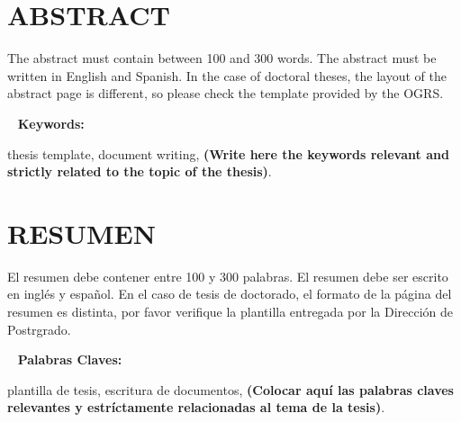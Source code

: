 \documentclass[12pt,reqno,oneside]{pucthesis}         %
\begin{document}
\chapter*{ABSTRACT}

The abstract must contain between 100 and 300 words.  The abstract must be written in English and Spanish.  In the case of doctoral theses, the layout of the abstract page is different, so please check the template provided by the OGRS.




~\vfill
{\bf Keywords:} \parbox[t]{.8\textwidth}{
  thesis template, document writing, {\bf (Write here the keywords
  relevant and strictly related to the topic of the thesis)}.}


\chapter*{RESUMEN}

El resumen debe contener entre 100 y 300 palabras. El resumen debe ser escrito en ingl\'es y espa\~nol.  En el caso de tesis de doctorado, el formato de la p\'agina del resumen es distinta, por favor verifique la plantilla entregada por la Direcci\'on de Postrgrado.



~\vfill
{\bf Palabras Claves:} \parbox[t]{.75\textwidth}{
  plantilla de tesis, escritura de documentos, {\bf (Colocar aqu\'i las
  palabras claves relevantes y estr\'ictamente relacionadas al tema de la tesis)}.}


\cleardoublepage %
\end{document}

